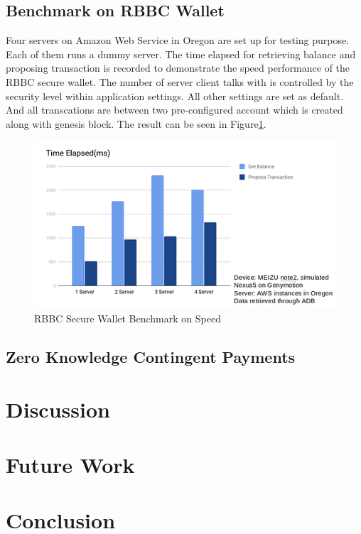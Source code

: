 \documentclass[12pt]{article}
\begin{document}
\subsection{Benchmark on RBBC Wallet}

Four servers on Amazon Web Service in Oregon are set up for testing purpose. Each of them runs a dummy server. The time elapsed for retrieving balance and proposing transaction is recorded to demonstrate the speed performance of the RBBC secure wallet. The number of server client talks with is controlled by the security level within application settings. All other settings are set as default. And all transcations are between two pre-configured account which is created along with genesis block. The result can be seen in Figure\ref{fig:benchmark}.

\begin{figure}
   \includegraphics{benchmark.png}
   \caption{RBBC Secure Wallet Benchmark on Speed}
   \label{fig:benchmark} 
\end{figure}

\subsection{Zero Knowledge Contingent Payments}


\section{Discussion}

\section{Future Work}

\section{Conclusion}



\newpage


\end{document}
